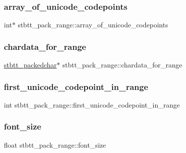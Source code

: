 \subsubsection{\texorpdfstring{array\+\_\+of\+\_\+unicode\+\_\+codepoints}{array\_of\_unicode\_codepoints}}
{\footnotesize\ttfamily int$\ast$ stbtt\+\_\+pack\+\_\+range\+::array\+\_\+of\+\_\+unicode\+\_\+codepoints}

\hypertarget{structstbtt__pack__range_aa8f7ddd637ed341ea39b08466fab9284}{}\label{structstbtt__pack__range_aa8f7ddd637ed341ea39b08466fab9284} 
\subsubsection{\texorpdfstring{chardata\+\_\+for\+\_\+range}{chardata\_for\_range}}
{\footnotesize\ttfamily \hyperlink{structstbtt__packedchar}{stbtt\+\_\+packedchar}$\ast$ stbtt\+\_\+pack\+\_\+range\+::chardata\+\_\+for\+\_\+range}

\hypertarget{structstbtt__pack__range_a3b414cbee1e164c29dd138e0ae3d5759}{}\label{structstbtt__pack__range_a3b414cbee1e164c29dd138e0ae3d5759} 
\subsubsection{\texorpdfstring{first\+\_\+unicode\+\_\+codepoint\+\_\+in\+\_\+range}{first\_unicode\_codepoint\_in\_range}}
{\footnotesize\ttfamily int stbtt\+\_\+pack\+\_\+range\+::first\+\_\+unicode\+\_\+codepoint\+\_\+in\+\_\+range}

\hypertarget{structstbtt__pack__range_a296916dc971e5e7627822fe98dc42828}{}\label{structstbtt__pack__range_a296916dc971e5e7627822fe98dc42828} 
\subsubsection{\texorpdfstring{font\+\_\+size}{font\_size}}
{\footnotesize\ttfamily float stbtt\+\_\+pack\+\_\+range\+::font\+\_\+size}

